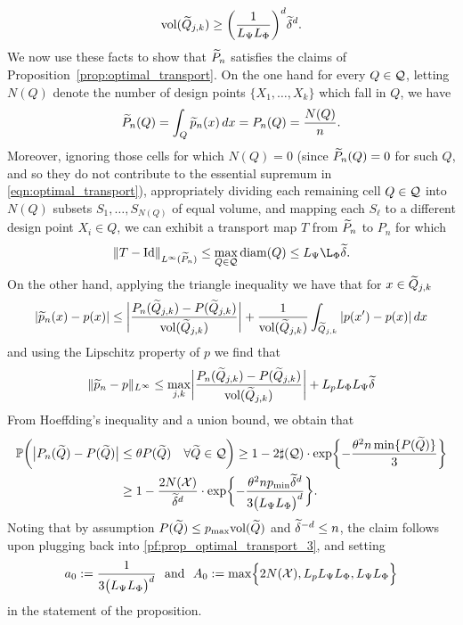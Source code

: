 \begin{equation}
\label{pf:prop_optimal_transport_2}
\text{vol}(\widetilde{Q}_{j,k}) \geq \biggl(\frac{1}{L_{\Psi} L_{\Phi}}\biggr)^d \widetilde{\delta}^d.
\end{equation}
We now use these facts to show that $\widetilde{P}_n$ satisfies the claims of Proposition~\ref{prop:optimal_transport}. On the one hand for every $Q \in \mathcal{Q}$, letting $N(Q)$ denote the number of design points $\{X_1,\ldots,X_k\}$ which fall in $Q$, we have
\begin{equation*}
\widetilde{P}_n(Q) = \int_{Q} \widetilde{p}_n(x) \,dx = P_n(Q) = \frac{N(Q)}{n}.
\end{equation*}
Moreover, ignoring those cells for which $N(Q) = 0$ (since $\widetilde{P}_n(Q) = 0$ for such $Q$, and so they do not contribute to the essential supremum in \eqref{eqn:optimal_transport}), appropriately dividing each remaining cell $Q \in \mathcal{Q}$ into $N(Q)$ subsets $S_1,\ldots,S_{N(Q)}$ of equal volume, and mapping each $S_{\ell}$ to a different design point $X_i \in Q$, we can exhibit a transport map $T$ from $\widetilde{P}_n$ to $P_n$ for which
\begin{equation*}
\|T - \mathrm{Id}\|_{L^{\infty}(\wt{P}_n)} \leq \max_{Q \in \mc{Q}} \diam(Q) \leq   L_{\Psi} \L_{\Phi} \wt{\delta}.
\end{equation*}
On the other hand, applying the triangle inequality we have that for $x \in \widetilde{Q}_{j,k}$
\begin{align*}
|\widetilde{p}_n(x) - p(x)| \leq \biggl|\frac{P_n(\widetilde{Q}_{j,k}) - P(\widetilde{Q}_{j,k})}{\text{vol}(\widetilde{Q}_{j,k})}\biggr| + \frac{1}{\text{vol}(\widetilde{Q}_{j,k})} \int_{\widetilde{Q}_{j,k}} |p(x') - p(x)| \,dx 
\end{align*}
and using the Lipschitz property of $p$ we find that 
\begin{equation}
\label{pf:prop_optimal_transport_3}
\|\widetilde{p}_n - p\|_{L^{\infty}} \leq \max_{j,k} \biggl|\frac{P_n(\widetilde{Q}_{j,k}) - P(\widetilde{Q}_{j,k})}{\text{vol}(\widetilde{Q}_{j,k})}\biggr| + L_p L_{\Phi} L_{\Psi} \widetilde{\delta}
\end{equation}
From Hoeffding's inequality and a union bound, we obtain that 
\begin{align*}
\mathbb{P}\biggl( \bigl|P_n(\widetilde{Q}) - P(\widetilde{Q})\bigr| & \leq \theta P(\widetilde{Q}) \quad \forall \widetilde{Q} \in \mathcal{Q} \biggr) \geq 1 - 2 \sharp(\mathcal{Q}) \cdot \exp\biggl\{-\frac{\theta^2 n \min \{P(\widetilde{Q})\}}{3}\biggr\} \\
& \geq 1 - \frac{2 N(\mathcal{X})}{\widetilde{\delta}^d} \cdot \exp\biggl\{-\frac{\theta^2 n p_{\min} \widetilde{\delta}^d }{3\bigl(L_{\Psi} L_{\Phi}\bigr)^d}\biggr\}.
\end{align*}
Noting that by assumption $P(\widetilde{Q}) \leq p_{\max} \text{vol}(\widetilde{Q})$ and $\widetilde{\delta}^{-d} \leq n$, the claim follows upon plugging back into \eqref{pf:prop_optimal_transport_3}, and setting
\begin{equation*}
a_0 := \frac{1}{3\bigl(L_{\Psi} L_{\Phi}\bigr)^d}~~\textrm{and}~~A_0 := \max \Bigl\{2N(\mathcal{X}),L_p L_{\Psi} L_{\Phi}, L_{\Psi} L_{\Phi}\Bigr\}
\end{equation*}
in the statement of the proposition.

